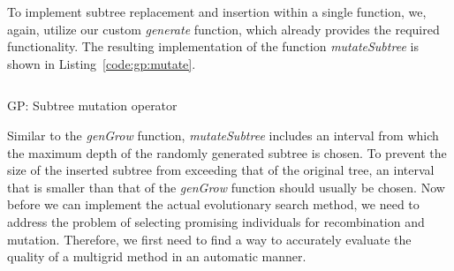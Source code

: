 To implement subtree replacement and insertion within a single function, we, again, utilize our custom \emph{generate} function, which already provides the required functionality.
The resulting implementation of the function \emph{mutateSubtree} is shown in Listing~\ref{code:gp:mutate}.
\begin{listing}[ht]
	\inputminted{python}{evostencils/gp/mutate.py}
	\caption{GP: Subtree mutation operator}
	\label{code:gp:mutate}
\end{listing}
Similar to the \emph{genGrow} function, \emph{mutateSubtree} includes an interval from which the maximum depth of the randomly generated subtree is chosen.
To prevent the size of the inserted subtree from exceeding that of the original tree, an interval that is smaller than that of the \emph{genGrow} function should usually be chosen.
Now before we can implement the actual evolutionary search method, we need to address the problem of selecting promising individuals for recombination and mutation.
Therefore, we first need to find a way to accurately evaluate the quality of a multigrid method in an automatic manner.

